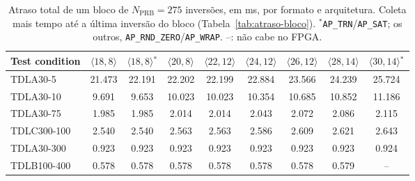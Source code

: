 \begin{table}[htbp]
\caption[Atraso total de um bloco de $N_{\text{PRB}} = 275$ inversões, em ms, por formato e arquitetura.]{Atraso total de um bloco de $N_{\text{PRB}} = 275$ inversões, em ms, por formato e arquitetura. Coleta mais tempo até a última inversão do bloco (Tabela~\ref{tab:atraso-bloco}). $^{*}$\texttt{AP\_TRN}/\texttt{AP\_SAT}; os outros, \texttt{AP\_RND\_ZERO}/\texttt{AP\_WRAP}. --: não cabe no FPGA.}
\label{tab:atraso-formatos}
\vspace{4pt}
\centering
\footnotesize
\renewcommand{\arraystretch}{1.2}
\setlength{\tabcolsep}{3pt}
\begin{tabular}{lcccccccc}
\toprule
\textbf{Test condition} & \textbf{$\langle 18,8\rangle$} & \textbf{$\langle 18,8\rangle$$^{*}$} & \textbf{$\langle 20,8\rangle$} & \textbf{$\langle 22,12\rangle$} & \textbf{$\langle 24,12\rangle$} & \textbf{$\langle 26,12\rangle$} & \textbf{$\langle 28,14\rangle$} & \textbf{$\langle 30,14\rangle$$^{*}$} \\
\midrule
TDLA30-5 & 21.473 & 22.191 & 22.202 & 22.199 & 22.884 & 23.566 & 24.239 & 25.724 \\
TDLA30-10 & 9.691 & 9.653 & 10.023 & 10.023 & 10.354 & 10.685 & 10.852 & 11.186 \\
TDLA30-75 & 1.985 & 1.985 & 2.014 & 2.014 & 2.043 & 2.072 & 2.086 & 2.115 \\
TDLC300-100 & 2.540 & 2.540 & 2.563 & 2.563 & 2.586 & 2.609 & 2.621 & 2.643 \\
TDLA30-300 & 0.923 & 0.923 & 0.923 & 0.923 & 0.923 & 0.923 & 0.923 & 0.924 \\
TDLB100-400 & 0.578 & 0.578 & 0.578 & 0.578 & 0.578 & 0.578 & 0.579 & -- \\
\bottomrule
\end{tabular}
\vspace{4pt}
\end{table}
